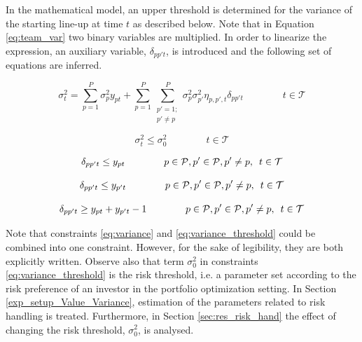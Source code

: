 In the mathematical model, an upper threshold is determined for the variance of the starting line-up at time $t$ as described below. Note that in Equation \ref{eq:team_var} two binary variables are multiplied. In order to linearize the expression, an auxiliary variable, $\delta_{pp't}$, is introduced and the following set of equations are inferred.

\begin{equation} \label{eq:variance}
    \sigma^2_{t} = \sum_{p = 1}^{P}\sigma_p^2 y_{pt} + \sum_{p = 1}^{P}\sum_{\substack{p' = 1; \\ p' \neq p}}^{P} \sigma_p^2\sigma_{p'}^2\eta_{p,p',t} \delta_{pp't} \qquad\qquad t \in \mathcal{T}
\end{equation}

\begin{equation} \label{eq:variance_threshold}
    \sigma^2_{t} \leq \sigma_{0}^2 \qquad\qquad t \in \mathcal{T}
\end{equation}

\begin{equation} \label{eq:variance_p_beta}
    \delta_{pp't} \leq y_{pt}  \qquad\qquad p \in \mathcal{P}, p' \in \mathcal{P}, p' \neq p, \enskip t \in \mathcal{T}
\end{equation}

\begin{equation} \label{eq:variance_p_dash_beta}
    \delta_{pp't} \leq y_{p't}  \qquad\qquad p \in \mathcal{P}, p' \in \mathcal{P}, p' \neq p, \enskip t \in \mathcal{T}
\end{equation}

\begin{equation} \label{eq:variance_p_p_dash_beta}
    \delta_{pp't} \geq y_{pt} + y_{p't} - 1  \qquad\qquad p \in \mathcal{P}, p' \in \mathcal{P}, p' \neq p, \enskip t \in \mathcal{T}
\end{equation}

Note that constraints \eqref{eq:variance} and \eqref{eq:variance_threshold} could be combined into one constraint. However, for the sake of legibility, they are both explicitly written. Observe also that term $\sigma_{0}^2$ in constraints \eqref{eq:variance_threshold} is the risk threshold, i.e. a parameter set according to the risk preference of an investor in the portfolio optimization setting. In Section \ref{exp_setup_Value_Variance}, estimation of the parameters related to risk handling is treated. Furthermore, in Section \ref{sec:res_risk_hand} the effect of changing the risk threshold, $\sigma_{0}^2$, is analysed.


